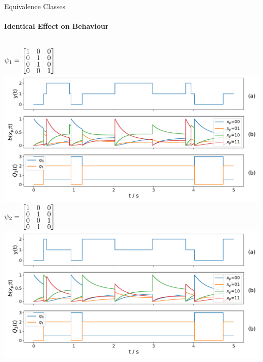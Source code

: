 \documentclass[
english,%
aspectratio=169,%
color={accentcolor=3b},
logo=true,%
colorframetitle=false,%
]{tudabeamer}
\begin{document}
\begin{frame}{Equivalence Classes}
\framesubtitle{Identical Effect on Behaviour}
	\begin{columns}
	$ \psi_1 = 
	\begin{bmatrix} \vspace{-3pt}
	1 & 0 & 0 \\  \vspace{-3pt}
	0 & 1 & 0 \\  \vspace{-3pt}
	0 & 1 & 0 \\  \vspace{-2pt}
	0 & 0 & 1
	\end{bmatrix} $\\
	\includegraphics[height=0.5\textheight]{figures/same_behaviour/psi_0}
	$ \psi_{2} =
	\begin{bmatrix}\vspace{-3pt}
	1 & 0 & 0 \\\vspace{-3pt}
	0 & 1 & 0 \\\vspace{-3pt}
	0 & 0 & 1 \\\vspace{-2pt}
	0 & 1 & 0 
	\end{bmatrix} $\\
	\includegraphics[height=0.5\textheight]{figures/same_behaviour/psi_16}
\end{columns}
\end{frame}
\end{document}
